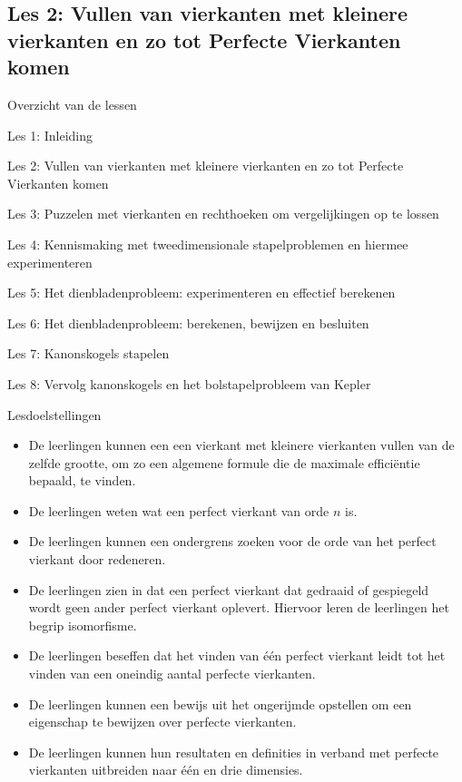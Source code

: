 \documentclass[dutch]{beamer}
\begin{document}
\subsection{Les 2: Vullen van vierkanten met kleinere vierkanten en zo tot Perfecte Vierkanten komen}
\begin{frame}
{Overzicht van de lessen}
\begin{list}{\quad}{}
\item Les 1: Inleiding
\item {\color{blue}Les 2: Vullen van vierkanten met kleinere vierkanten en zo tot Perfecte Vierkanten komen}
\item Les 3: Puzzelen met vierkanten en rechthoeken om vergelijkingen op te lossen
\item Les 4: Kennismaking met tweedimensionale stapelproblemen en hiermee experimenteren
\item Les 5: Het dienbladenprobleem: experimenteren en effectief berekenen
\item Les 6: Het dienbladenprobleem: berekenen, bewijzen en besluiten
\item Les 7: Kanonskogels stapelen
\item Les 8: Vervolg kanonskogels en het bolstapelprobleem van Kepler
\end{list}
\end{frame}

\begin{frame}{Lesdoelstellingen}
\begin{itemize}
\item De leerlingen kunnen een een vierkant met kleinere vierkanten vullen van de zelfde grootte, om zo een algemene formule die de maximale effici\"{e}ntie bepaald, te vinden.
\item De leerlingen weten wat een perfect vierkant van orde $n$ is.
\item De leerlingen kunnen een ondergrens zoeken voor de orde van het perfect vierkant door redeneren.
\item De leerlingen zien in dat een perfect vierkant dat gedraaid of gespiegeld wordt geen ander perfect vierkant oplevert. Hiervoor leren de leerlingen het begrip isomorfisme.
\item De leerlingen beseffen dat het vinden van \'{e}\'{e}n perfect vierkant leidt tot het vinden van een oneindig aantal perfecte vierkanten. 
\item De leerlingen kunnen een bewijs uit het ongerijmde opstellen om een eigenschap te bewijzen over perfecte vierkanten.
\item De leerlingen kunnen hun resultaten en definities in verband met perfecte vierkanten uitbreiden naar \'{e}\'{e}n en drie dimensies.
\end{itemize}
\end{frame}
\end{document}
